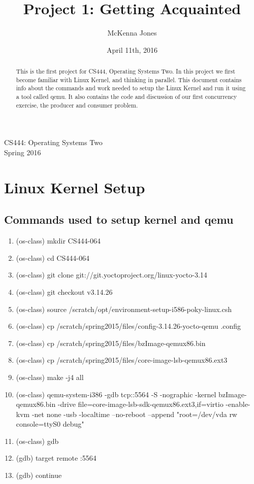 \documentclass[letterpaper,10pt,titlepage,draftclsnofoot,onecolumn]{IEEEtran}
\title{Project 1: Getting Acquainted}
\author{McKenna Jones}
\date{April 11th, 2016}
\begin{document}
\begin{titlepage}

\maketitle
\begin{center}
CS444: Operating Systems Two \\
Spring 2016
\vspace{50 mm}
\end{center}
\begin{abstract}
This is the first project for CS444, Operating Systems Two. In this project we first become familiar with Linux Kernel, and thinking in parallel. This document contains info about the commands and work needed to setup the Linux Kernel and run it using a tool called qemu. It also contains the code and discussion of our first concurrency exercise, the producer and consumer problem. 
\end{abstract}
\end{titlepage}
\section{Linux Kernel Setup}
\subsection{Commands used to setup kernel and qemu}
\begin{enumerate}
\item (os-class) mkdir CS444-064
\item (os-class) cd CS444-064
\item (os-class) git clone git://git.yoctoproject.org/linux-yocto-3.14
\item (os-class) git checkout v3.14.26
\item (os-class) source /scratch/opt/environment-setup-i586-poky-linux.csh
\item (os-class) cp /scratch/spring2015/files/config-3.14.26-yocto-qemu .config
\item (os-class) cp /scratch/spring2015/files/bzImage-qemux86.bin
\item (os-class) cp /scratch/spring2015/files/core-image-lsb-qemux86.ext3
\item (os-class) make -j4 all
\item (os-class) qemu-system-i386 -gdb tcp::5564 -S -nographic -kernel bzImage-qemux86.bin -drive file=core-image-lsb-sdk-qemux86.ext3,if=virtio -enable-kvm -net none -usb -localtime --no-reboot --append "root=/dev/vda rw console=ttyS0 debug"
\item (os-class) gdb
\item (gdb) target remote :5564
\item (gdb) continue
\end{enumerate}
\end{document}
